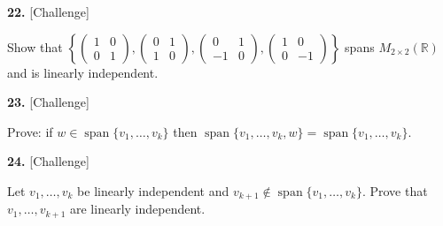 \documentclass[11pt]{article}
\begin{document}
\begin{minipage}{\linewidth}\textbf{22.} \hfill{\scriptsize\color{ink}[Challenge]}\par\nopagebreak Show that $\left\{\begin{pmatrix}1&0\\0&1\end{pmatrix},\begin{pmatrix}0&1\\1&0\end{pmatrix},\begin{pmatrix}0&1\\-1&0\end{pmatrix},\begin{pmatrix}1&0\\0&-1\end{pmatrix}\right\}$ spans $M_{2\times2}(\mathbb{R})$ and is linearly independent.
\vspace{6.0cm}\end{minipage}\par\vspace{4pt}
\begin{minipage}{\linewidth}\textbf{23.} \hfill{\scriptsize\color{ink}[Challenge]}\par\nopagebreak Prove: if $w\in\operatorname{span}\{v_1,\dots,v_k\}$ then $\operatorname{span}\{v_1,\dots,v_k,w\}=\operatorname{span}\{v_1,\dots,v_k\}$.
\vspace{5.0cm}\end{minipage}\par\vspace{4pt}
\begin{minipage}{\linewidth}\textbf{24.} \hfill{\scriptsize\color{ink}[Challenge]}\par\nopagebreak Let $v_1,\dots,v_k$ be linearly independent and $v_{k+1}\notin\operatorname{span}\{v_1,\dots,v_k\}$. Prove that $v_1,\dots,v_{k+1}$ are linearly independent.
\vspace{5.4cm}\end{minipage}\par\vspace{4pt}
\end{document}
